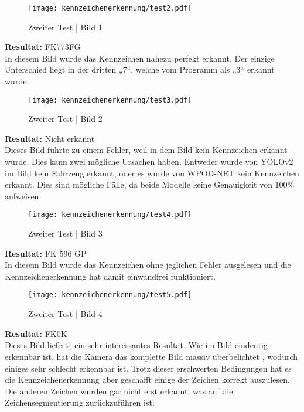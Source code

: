 \begin{figure}[H]
    \centering
    \texttt{[image: kennzeichenerkennung/test2.pdf]}
    \caption{Zweiter Test | Bild 1}
\end{figure}

\textbf{Resultat:} FK773FG\\

In diesem Bild wurde das Kennzeichen nahezu perfekt erkannt. Der einzige Unterschied liegt in der dritten „7“, welche vom Programm als „3“ erkannt wurde.

\begin{figure}[H]
    \centering
    \texttt{[image: kennzeichenerkennung/test3.pdf]}
    \caption{Zweiter Test | Bild 2}
\end{figure}

\textbf{Resultat:} Nicht erkannt\\

Dieses Bild führte zu einem Fehler, weil in dem Bild kein Kennzeichen erkannt wurde. Dies kann zwei mögliche Ursachen haben. 
Entweder wurde von YOLOv2 im Bild kein Fahrzeug erkannt, oder es wurde von WPOD-NET kein Kennzeichen erkannt. Dies sind mögliche Fälle, da beide Modelle keine 
Genauigkeit von 100\% aufweisen.

\begin{figure}[H]
    \centering
    \texttt{[image: kennzeichenerkennung/test4.pdf]}
    \caption{Zweiter Test | Bild 3}
\end{figure}

\textbf{Resultat:} FK 596 GP\\

In diesem Bild wurde das Kennzeichen ohne jeglichen Fehler ausgelesen und die Kennzeichenerkennung hat damit einwandfrei funktioniert.

\begin{figure}[H]
    \centering
    \texttt{[image: kennzeichenerkennung/test5.pdf]}
    \caption{Zweiter Test | Bild 4}
\end{figure}

\textbf{Resultat:} FK0K\\

Dieses Bild lieferte ein sehr interessantes Resultat. Wie im Bild eindeutig erkennbar ist, hat die Kamera das komplette Bild massiv überbelichtet , 
wodurch einiges sehr schlecht erkennbar ist. Trotz dieser erschwerten Bedingungen hat es die Kennzeichenerkennung aber geschafft einige der Zeichen 
korrekt auszulesen. Die anderen Zeichen wurden gar nicht erst erkannt, was auf die Zeichensegmentierung zurückzuführen ist.

